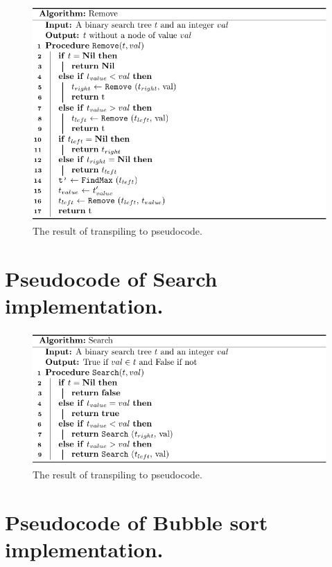 \begin{figure}[!htb]
    \centering
    \includegraphics[scale=.8]{assets/chapter6/bst/Remove_tbp.pdf}
    \caption{The result of transpiling  to pseudocode.}
    \label{removeTBP}
\end{figure}

\section{Pseudocode of Search implementation.}
\label{Pseudocode of Search implementation.}


\begin{figure}[!htb]
    \centering
    \includegraphics[scale=.8]{assets/chapter6/bst/Search_tbp.pdf}
    \caption{The result of transpiling  to pseudocode.}
    \label{searchTBP}
\end{figure}

\newpage

\section{Pseudocode of Bubble sort implementation.}
\label{Pseudocode of Bubble sort implementation.}

